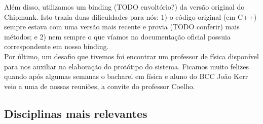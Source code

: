 Além disso, utilizamos um binding (TODO envoltório?) da versão original do Chipmunk. Isto trazia duas dificuldades para nós: 1) o código original (em C++) sempre estava com uma versão mais recente e provia (TODO conferir) mais métodos; e 2) nem sempre o que víamos na documentação oficial possuia correspondente em nosso binding. \\
 
Por último, um desafio que tivemos foi encontrar um professor de física disponível para nos auxiliar na elaboração do protótipo do sistema. Ficamos muito felizes quando após algumas semanas o bacharel em física e aluno do BCC João Kerr veio a uma de nossas reuniões, a convite do professor Coelho.\\

\subsection{Disciplinas mais relevantes}

